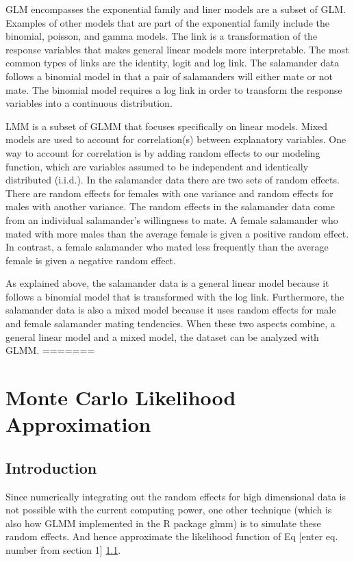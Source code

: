 \documentclass{article}
\begin{document}
GLM encompasses the exponential family and liner models are a subset of GLM.  Examples of other models that are part of the exponential family include the binomial, poisson, and gamma models.  The link is a transformation of the response variables that makes general linear models more interpretable.  The most common types of links are the identity, logit and log link.  The salamander data follows a binomial model in that a pair of salamanders will either mate or not mate.  The binomial model requires a log link in order to transform the response variables into a continuous distribution.
	
LMM is a subset of GLMM that focuses specifically on linear models.  Mixed models are used to account for correlation(s) between explanatory variables.  One way to account for correlation is by adding random effects to our modeling function, which are variables assumed to be independent and identically distributed (i.i.d.).  In the salamander data there are two sets of random effects.  There are random effects for females with one variance and random effects for males with another variance.  The random effects in the salamander data come from an individual salamander’s willingness to mate.  A female salamander who mated with more males than the average female is given a positive random effect.  In contrast, a female salamander who mated less frequently than the average female is given a negative random effect. 
	
As explained above, the salamander data is a general linear model because it follows a binomial model that is transformed with the log link.  Furthermore, the salamander data is also a mixed model because it uses random effects for male and female salamander mating tendencies.  When these two aspects combine, a general linear model and a mixed model, the dataset can be analyzed with GLMM. 
=======
\section{Monte Carlo Likelihood Approximation}
\subsection{Introduction}
Since numerically integrating out the random effects for high dimensional data is not possible with the current computing power, one other technique (which is also how GLMM implemented in the R package glmm) is to simulate these random effects.
And hence approximate the likelihood function of Eq [enter eq. number from section 1] \ref{}.
\end{document}
